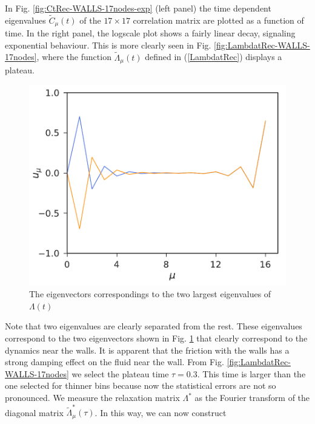 \documentclass[b5paper,openright,10pt]{book}
\begin{document}
In  Fig.
\ref{fig:CtRec-WALLS-17nodes-exp}   (left   panel)   the   time   dependent   eigenvalues
$\tilde{C}_{\mu}(t)$  of  the  $17\times 17$  correlation  matrix  are
plotted as a function of time.  In the right panel, the logscale plot
shows a fairly linear decay, signaling exponential behaviour.  This is
more  clearly   seen  in   Fig. \ref{fig:LambdatRec-WALLS-17nodes},  where   the  function
$\tilde{\Lambda}_\mu(t)$  defined  in  (\ref{LambdatRec})  displays  a
plateau.  
\begin{figure}[h!]
  \centering
  \includegraphics[scale=0.41]{Eigenvectors-WALLS-17nodes}
    \caption[The igenvectors correspondings to the two largest eigenvalues of $\Lambda(t)$ for a confioned fluid - Thick bins]{
        The eigenvectors correspondings to the two largest eigenvalues of $\Lambda(t)$}
\label{Fig.WallEigenvectors2}
\end{figure}
Note that  two eigenvalues are  clearly separated
from the rest.   These eigenvalues correspond to  the two eigenvectors
shown in  Fig. \ref{Fig.WallEigenvectors2} that clearly  correspond to
the  dynamics  near  the   walls.  
It is apparent  that the friction with the walls  has a strong damping
effect on  the fluid  near the wall.   From Fig. \ref{fig:LambdatRec-WALLS-17nodes} we
select the plateau  time $\tau=0.3$. This time is larger  than the one
selected for thinner bins because now the statistical errors are not so
pronounced.  We  measure  the  relaxation matrix  $\Lambda^*$  as  the
Fourier       transform       of       the       diagonal       matrix
$\tilde{\Lambda}_{\mu}^*(\tau)$.  In  this way,  we can  now construct
\end{document}
